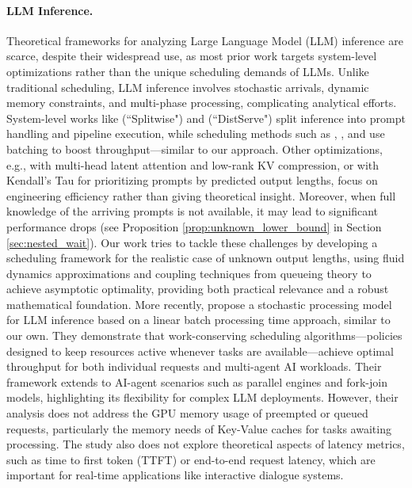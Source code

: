 \documentclass[10pt,letterpaper]{article}
\begin{document}
\paragraph*{LLM Inference.} 
Theoretical frameworks for analyzing Large Language Model (LLM) inference are scarce, despite their widespread use, as most prior work targets system-level optimizations rather than the unique scheduling demands of LLMs. Unlike traditional scheduling, LLM inference involves stochastic arrivals, dynamic memory constraints, and multi-phase processing, complicating analytical efforts. System-level works like \cite{patel2023peeling} (``Splitwise") and \cite{zhong2024distserve} (``DistServe") split inference into prompt handling and pipeline execution, while scheduling methods such as \cite{yu2022orca}, \cite{agrawal2023sarathi}, and \cite{agrawal2024taming} use batching to boost throughput—similar to our approach. Other optimizations, e.g., \cite{deepseekai2024deepseekv2strongeconomicalefficient} with multi-head latent attention and low-rank KV compression, or \cite{fu2025efficient} with Kendall’s Tau for prioritizing prompts by predicted output lengths, focus on engineering efficiency rather than giving theoretical insight. 
Moreover, when full knowledge of the arriving prompts is not available, it may lead to significant performance drops (see Proposition \ref{prop:unknown_lower_bound} in Section \ref{sec:nested_wait}). Our work tries to tackle these challenges by developing a scheduling framework for the realistic case of unknown output lengths, using fluid dynamics approximations and coupling techniques from queueing theory to achieve asymptotic optimality, providing both practical relevance and a robust mathematical foundation. More recently, \cite{li2025throughput} propose a stochastic processing model for LLM inference based on a linear batch processing time approach, similar to our own. They demonstrate that work-conserving scheduling algorithms—policies designed to keep resources active whenever tasks are available—achieve optimal throughput for both individual requests and multi-agent AI workloads. Their framework extends to AI-agent scenarios such as parallel engines and fork-join models, highlighting its flexibility for complex LLM deployments. However, their analysis does not address the GPU memory usage of preempted or queued requests, particularly the memory needs of Key-Value caches for tasks awaiting processing. The study also does not explore theoretical aspects of latency metrics, such as time to first token (TTFT) or end-to-end request latency, which are important for real-time applications like interactive dialogue systems.
\end{document}
